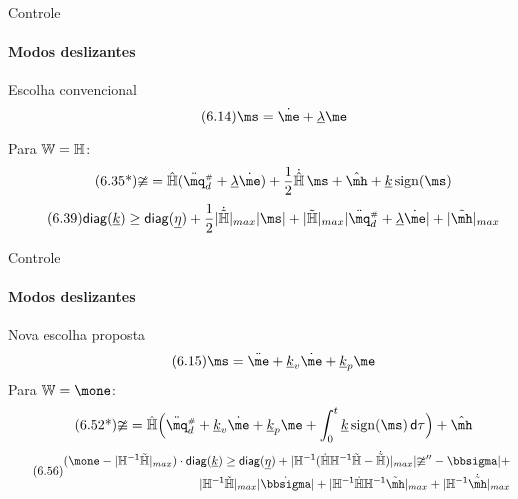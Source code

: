 \documentclass[25pt,landscape]{beamer}
\begin{document}
\begin{frame}{Controle}
    \framesubtitle{Modos deslizantes}
    \begin{block}{Escolha convencional}
    	\begin{equation} \tag{6.14} 
			\ms = \dot{\me} + \underline{\lambda} \me
		\end{equation}

		Para $\mathbb{W} = \mathbb{H}$:
		\begin{equation} \tag{6.35*}
			\mup = \hat{\mH}(\ddot{\mq}\ssh_d + \underline{\lambda} \dot{\me}) + \frac{1}{2}\dot{\hat{\mH}} \, \ms + \hat{\mh} + \underline{k} \sign(\ms)
		\end{equation}
		\pause
		\begin{equation} \label{eq:DesigualdadeK2_a2} \tag{6.39}
			\diag(\underline{k})  \geq \diag(\underline{\eta}) + \frac{1}{2}|\dot{\tilde{\mH}}|_{max} |\ms| + |\tilde{\mH}|_{max} |\ddot{\mq}\ssh_d + \underline{\lambda} \dot{\me}| + |\tilde{\mh}|_{max}
		\end{equation}
    \end{block}
\end{frame}

\begin{frame}{Controle}
    \framesubtitle{Modos deslizantes}
    \pause
    \begin{block}{Nova escolha proposta}
    	\begin{equation} \tag{6.15} 
			\ms = \ddot{\me} + \underline{k}_v \dot{\me} + \underline{k}_p \me
		\end{equation} 
		\pause
		Para $\mW = \mone$:
		\begin{equation} \tag{6.52*}
			\mup = \hat{\mH} \Big(\ddot{\mq}\ssh_d + \underline{k}_v \dot{\me} + \underline{k}_p \me + \int_{0}^t \underline{k} \sign(\ms) \, \dd \tau \Big) + \hat{\mh}
		\end{equation}
		\pause
		\begin{equation} \label{eq:DesigualdadeK2_b1} \tag{6.56}
		\begin{split}
			(\mone - | \mH^\msI \tilde{\mH}|_{max} ) \cdot \diag(\underline{k})  \geq \diag(\underline{\eta}) + |\mH^\msI ( \dot{\mH} \mH^\msI \tilde{\mH} -\dot{\tilde{\mH}}) |_{max} | \mup'' -\msigma|  + \\ |\mH^\msI \tilde{\mH}|_{max}| \dot{\msigma}| + |\mH^\msI \dot{\mH} \mH^\msI  \tilde{\mh}|_{max}+ |\mH^\msI \dot{\tilde{\mh}}|_{max}
		\end{split}
		\end{equation}
    \end{block}
\end{frame}
\end{document}
